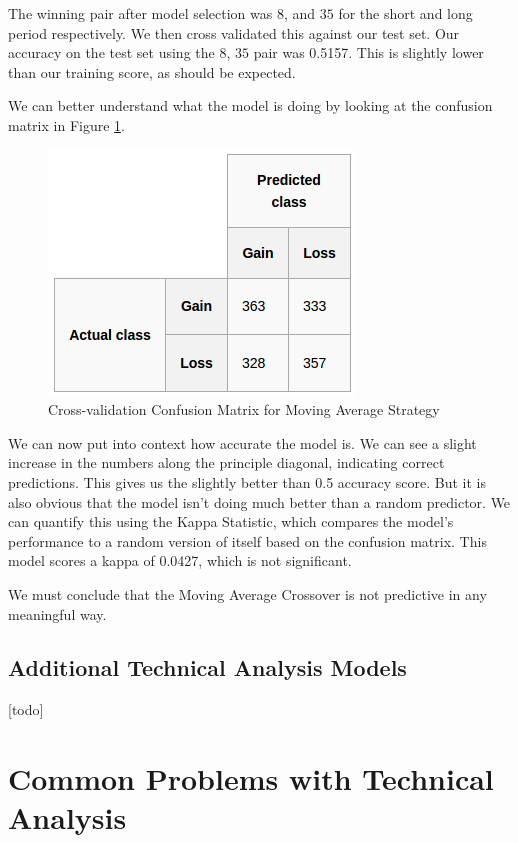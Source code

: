 \documentclass{report}
\begin{document}
The winning pair after model selection was $8$, and $35$ for the short and long period respectively. We then cross validated this against our test set. Our accuracy on the test set using the $8$, $35$ pair was 0.5157. This is slightly lower than our training score, as should be expected.

We can better understand what the model is doing by looking at the confusion matrix in Figure \ref{fig:ma-confusion}.

\begin{figure}[H]
	\caption{Cross-validation Confusion Matrix for Moving Average Strategy}
	\centerline{\includegraphics[scale=0.75]{vis/ma_confusion.png}}
	\label{fig:ma-confusion}
\end{figure}

We can now put into context how accurate the model is. We can see a slight increase in the numbers along the principle diagonal, indicating correct predictions. This gives us the slightly better than 0.5 accuracy score. But it is also obvious that the model isn't doing much better than a random predictor. We can quantify this using the Kappa Statistic, which compares the model's performance to a random version of itself based on the confusion matrix. This model scores a kappa of 0.0427, which is not significant. 

We must conclude that the Moving Average Crossover is not predictive in any meaningful way.

\subsection{Additional Technical Analysis Models}

[todo]

\section{Common Problems with Technical Analysis}
\end{document}
